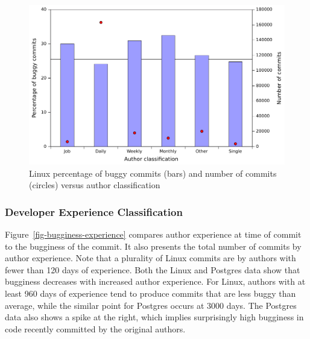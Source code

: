 \begin{figure}
\begin{center}
\includegraphics[width=\columnwidth]{linux-bugginess-author-class.pdf}
\end{center}
\caption{\label{fig-linux-bugginess-author-class}Linux percentage of buggy commits (bars) and number of commits (circles) versus author classification}
\end{figure}




\subsubsection{Developer Experience Classification}

Figure~\ref{fig-bugginess-experience} compares author experience at
time of commit to the bugginess of the commit. It also presents the
total number of commits by author experience. Note that a plurality of
Linux commits are by authors with fewer than 120 days of experience.
Both the Linux and Postgres data show that bugginess decreases with
increased author experience. For Linux, authors with at least 960 days
of experience tend to produce commits that are less buggy than
average, while the similar point for Postgres occurs at 3000 days.
The Postgres data also shows a spike at the right, which implies
surprisingly high bugginess in code recently committed by the original
authors.

